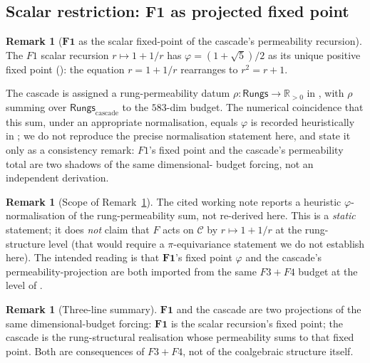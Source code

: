 \documentclass[11pt, a4paper]{amsart}
\theoremstyle{definition}
\newtheorem{remark}[theorem]{Remark}
\newcommand{\R}{\mathbb{R}}
\newcommand{\Rungs}{\mathsf{Rungs}}
\newcommand{\catC}{\mathcal{C}}
\begin{document}
\subsection{Scalar restriction: $\mathbf{F1}$ as projected fixed
  point}

\begin{remark}[$\mathbf{F1}$ as the scalar fixed-point of the
  cascade's permeability recursion]
\label{prop:F1-shadow}
The $F1$ scalar recursion $r \mapsto 1 + 1/r$ has $\varphi =
(1+\sqrt{5})/2$ as its unique positive fixed point
(\cite[F1]{CascadeCompletenessAudit}): the equation $r =
1 + 1/r$ rearranges to $r^2 = r + 1$.

The cascade is assigned a rung-permeability datum $\rho \colon
\Rungs \to \R_{>0}$ in
\cite[\S 3]{CascadeCompletenessAudit}, with $\rho$ summing
over $\Rungs_{\mathrm{cascade}}$ to the $583$-dim budget. The
numerical coincidence that this sum, under an appropriate
normalisation, equals $\varphi$ is recorded heuristically in
\cite[\S 3.4]{CascadeCompletenessAudit}; we do not reproduce
the precise normalisation statement here, and state it only as
a consistency remark: $F1$'s fixed point and the cascade's
permeability total are two shadows of the same dimensional-
budget forcing, not an independent derivation.
\end{remark}

\begin{remark}[Scope of Remark~\ref{prop:F1-shadow}]
\label{rmk:F1-scope}
The cited working note reports a heuristic $\varphi$-normalisation
of the rung-permeability sum, not re-derived here. This is a
\emph{static} statement; it does \emph{not} claim that $F$
acts on $\catC$ by $r \mapsto 1 + 1/r$ at the rung-structure
level (that would require a $\pi$-equivariance statement we
do not establish here). The intended reading is that
$\mathbf{F1}$'s fixed point $\varphi$ and the cascade's
permeability-projection are both imported from the same
$F3+F4$ budget at the level of \cite{CascadeCompletenessAudit}.
\end{remark}

\begin{remark}[Three-line summary]
\label{rmk:F1-summary}
$\mathbf{F1}$ and the cascade are two projections of the same
dimensional-budget forcing: $\mathbf{F1}$ is the scalar
recursion's fixed point; the cascade is the rung-structural
realisation whose permeability sums to that fixed point. Both
are consequences of $F3+F4$, not of the coalgebraic structure
itself.
\end{remark}
\end{document}
